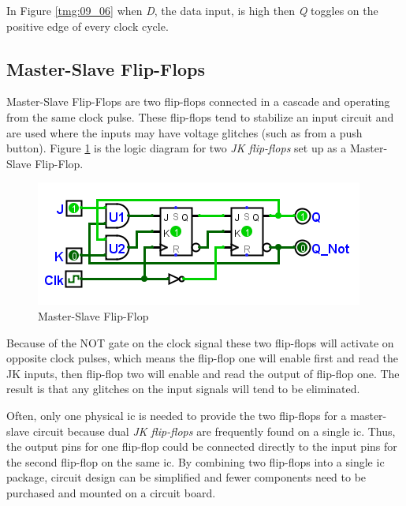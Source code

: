 In Figure \ref{tmg:09_06} when \emph{D}, the data input, is high then \emph{Q} toggles on the positive edge of every clock cycle.

\subsection{Master-Slave Flip-Flops}
\label{SL:subsec:master-slave_flip-flops}

Master-Slave Flip-Flops are two flip-flops connected in a cascade and operating from the same clock pulse. These flip-flops tend to stabilize an input circuit and are used where the inputs may have voltage glitches (such as from a push button). Figure \ref{fig:09_07} is the logic diagram for two \emph{JK flip-flops} set up as a Master-Slave Flip-Flop.

\begin{figure}[H]
	\centering
	\includegraphics[width=\maxwidth{.95\linewidth}]{gfx/09_07}
	\caption{Master-Slave Flip-Flop}
	\label{fig:09_07}
\end{figure}

Because of the \textsf{NOT} gate on the clock signal these two flip-flops will activate on opposite clock pulses, which means the flip-flop one will enable first and read the JK inputs, then flip-flop two will enable and read the output of flip-flop one. The result is that any glitches on the input signals will tend to be eliminated.

Often, only one physical \gls{ic} is needed to provide the two flip-flops for a master-slave circuit because dual \emph{JK flip-flops} are frequently found on a single \gls{ic}. Thus, the output pins for one flip-flop could be connected directly to the input pins for the second flip-flop on the same \gls{ic}. By combining two flip-flops into a single \gls{ic} package, circuit design can be simplified and fewer components need to be purchased and mounted on a circuit board. 

